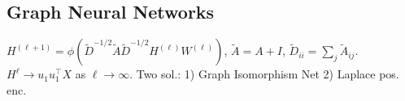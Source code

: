 
\subsection{Graph Neural Networks}
$H^{(\ell+1)} = \phi\left( \tilde{D}^{-1/2} \tilde{A} \tilde{D}^{-1/2} H^{(\ell)} W^{(\ell)} \right)$, $\tilde{A} = A + I$, $\tilde{D}_{ii} = \sum_j \tilde{A}_{ij}.$ \enskip
$H^{\ell} \to u_1u_1^\top X$ as $\ell \to \infty$. Two sol.: 1) Graph Isomorphism Net 2) Laplace pos. enc. 
